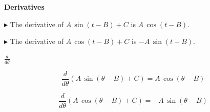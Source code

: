 \documentclass{ximera}
\begin{document}
\begin{template} \textbf{\textcolor{purple!65!blue}{Derivatives}}  

$\blacktriangleright$ The derivative of \textbf{\textcolor{purple!85!blue}{$A \, \sin(t - B) + C$}} is \textbf{\textcolor{blue!55!black}{$A \, \cos(t - B)$}}. 

$\blacktriangleright$ The derivative of \textbf{\textcolor{purple!85!blue}{$A \, \cos(t - B) + C$}} is \textbf{\textcolor{blue!55!black}{$-A \, \sin(t - B)$}}. 

\end{template}






\begin{notation} \textbf{\textcolor{red!50!green}{$\frac{d}{d\theta}$}} 

\[
\frac{d}{d\theta} (A \, \sin(\theta - B) + C) = A \, \cos(\theta - B)
\]

\[
\frac{d}{d\theta} (A \, \cos(\theta - B) + C) = -A \, \sin(\theta - B)
\]

\end{notation}
\end{document}
